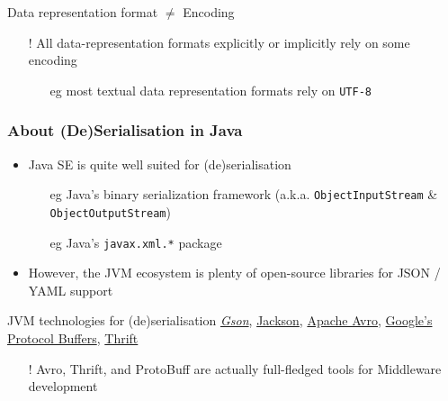 \documentclass[presentation]{beamer}\mode<presentation>{\usetheme{AMSCesenaPurpleAndGold}}
\begin{document}
\begin{frame}
\begin{block}{Data representation format $\neq$ Encoding}
\begin{itemize}
            \item[!] All data-representation formats explicitly or implicitly rely on some encoding
            \begin{itemize}
                \item[eg] most textual data representation formats rely on \texttt{UTF-8}
            \end{itemize} 
        \end{itemize}
    \end{block}

\end{frame}

\begin{frame}%
    \frametitle{About (De)Serialisation in Java}

    \begin{itemize}
        \item Java SE is quite well suited for (de)serialisation
        \begin{itemize}
            \item[eg] Java's binary serialization framework (a.k.a. \texttt{ObjectInputStream} \& \texttt{ObjectOutputStream})
            \item[eg] Java's \texttt{javax.xml.*} package
        \end{itemize}

        \vfill

        \item However, the JVM ecosystem is plenty of open-source libraries for JSON / YAML support
        
    \end{itemize}

    \vfill

    \begin{block}{JVM technologies for (de)serialisation}
        \href{https://github.com/google/gson}{\emph{Gson}}, 
        \href{https://github.com/FasterXML/jackson}{Jackson},
        \href{https://avro.apache.org/docs/1.10.0/}{Apache Avro},
        \href{https://developers.google.com/protocol-buffers}{Google's Protocol Buffers},
        \href{https://thrift.apache.org/}{Thrift}
    \end{block}
    \begin{itemize}\small
        \item[!] Avro, Thrift, and ProtoBuff are actually full-fledged tools for Middleware development
    \end{itemize}

\end{frame}
\end{document}
